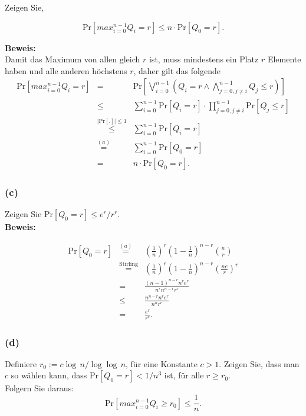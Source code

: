 \documentclass[11pt,a4paper,ngerman]{article}
\newcommand{\prob}[1]{\text{Pr}\left[ #1 \right]}
\begin{document}
Zeigen Sie,

$$
	\prob{max_{i=0}^{n-1} Q_i = r} \leq n \cdot \prob{Q_0 = r}.
$$

\noindent\textbf{Beweis:}\\
Damit das Maximum von allen gleich $r$ ist, muss mindestens ein Platz $r$ Elemente haben und alle anderen höchstens $r$, daher gilt das folgende
$$\begin{array}{rcl}
	\prob{max_{i=0}^{n-1} Q_i = r} &=& \prob{\bigvee_{i=0}^{n-1} \left( Q_i = r \wedge \bigwedge_{j=0, j \not= i}^{n-1} Q_j \leq r \right)}\\
		&\leq& \sum_{i=0}^{n-1} \prob{Q_i = r} \cdot \prod_{j=0, j \not= i}^{n-1} \prob{Q_j \leq r}\\
		&\stackrel{|\prob{.}|\leq 1}{\leq} & \sum_{i=0}^{n-1} \prob{Q_i = r}\\
		&\stackrel{(a)}{=}& \sum_{i=0}^{n-1} \prob{Q_0 = r}\\
		&=& n \cdot \prob{Q_0 = r}.
\end{array}$$

\subsubsection*{(c)}

Zeigen Sie $\prob{Q_0 = r} \leq e^r / r^r$.\\

\noindent\textbf{Beweis:}

$$\begin{array}{rcl}
	\prob{Q_0 = r} &\stackrel{(a)}{=}&  \left(\frac{1}{n} \right)^r \left( 1 - \frac{1}{n}\right)^{n-r} \binom{n}{r}\\
		&\stackrel{\text{Stirling}}{=}&  \left(\frac{1}{n} \right)^r \left( 1 - \frac{1}{n}\right)^{n-r} \left( \frac{ne}{r} \right)^r\\
		&=& \frac{(n-1)^{n-r}n^re^r}{n^r n^{n-r} r^r}\\
		&\leq& \frac{n^{n-r}n^re^r}{n^nr^r}\\
		&=& \frac{e^r}{r^r}.
\end{array}$$

\subsubsection*{(d)}

Definiere $r_0 := c \log \, n / \log \log \, n$, für eine Konstante $c > 1$. Zeigen Sie, dass man $c$ so wählen kann, dass $\prob{Q_0 = r} < 1 / n^3$ ist, für alle $r \geq r_0$.\\
Folgern Sie daraus:
$$
	\prob{max_{i=0}^{n-1} Q_i \geq r_0} \leq \frac{1}{n}.
$$
\end{document}
